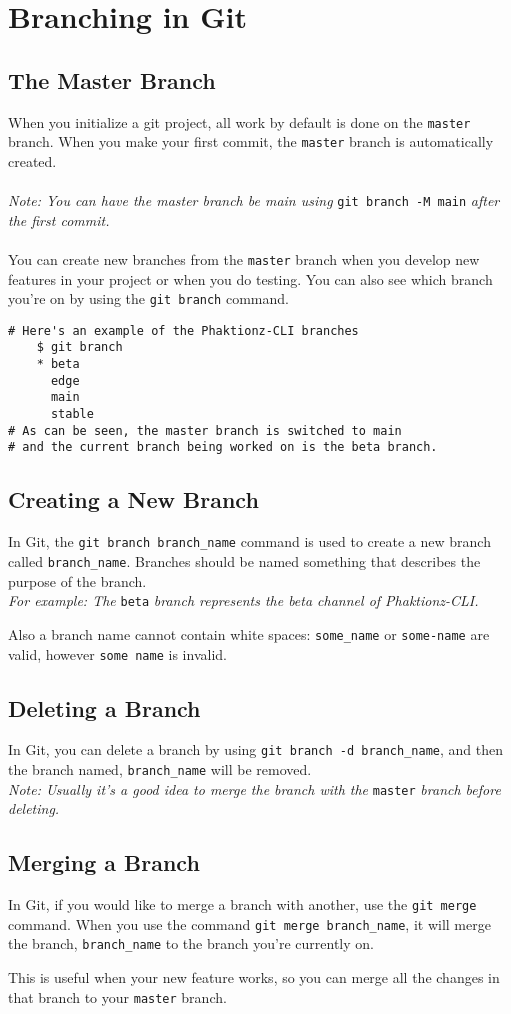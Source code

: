\chapter{Branching in Git}
\section{The Master Branch}

When you initialize a git project, all work by default is done on the \verb!master! branch. When you make your first commit, the \verb!master! branch is automatically created.
\\\\
\textit{Note: You can have the master branch be main using} \verb!git branch -M main! \textit{after the first commit.}
\\\\
You can create new branches from the \verb!master! branch when you develop new features in your project or when you do testing. 
You can also see which branch you're on by using the \verb!git branch! command. 

\begin{verbatim}
# Here's an example of the Phaktionz-CLI branches 
    $ git branch 
    * beta
      edge
      main
      stable
# As can be seen, the master branch is switched to main 
# and the current branch being worked on is the beta branch.     
\end{verbatim}

\section{Creating a New Branch}
In Git, the \verb!git branch branch_name! command is used to create a new branch called \verb!branch_name!. 
Branches should be named something that describes the purpose of the branch.
\\
\textit{For example: The }\verb!beta!\textit{ branch represents the beta channel of Phaktionz-CLI.}

Also a branch name cannot contain white spaces: \verb!some_name! or \verb!some-name! are valid, however \verb!some name! is invalid. 

\section{Deleting a Branch}
In Git, you can delete a branch by using \verb!git branch -d branch_name!, and then the branch named, \verb!branch_name! will be removed.
\\
\textit{Note: Usually it's a good idea to merge the branch with the }\verb!master!\textit{ branch before deleting.}

\section{Merging a Branch}
In Git, if you would like to merge a branch with another, use the \verb!git merge! command. 
When you use the command \verb!git merge branch_name!, it will merge the branch, \verb!branch_name! to the branch you're currently on.

This is useful when your new feature works, so you can merge all the changes in that branch to your \verb!master! branch. 
\newpage